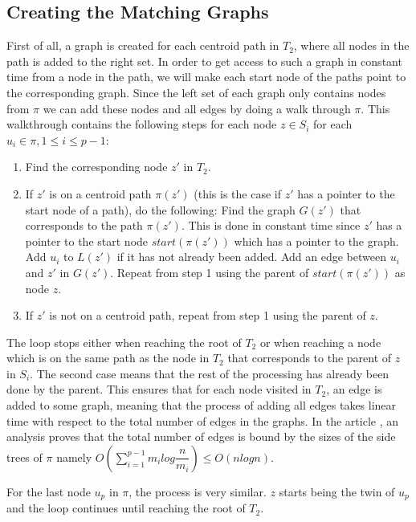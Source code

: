 \subsection{Creating the Matching Graphs}
First of all, a graph is created for each centroid path in $T_2$, where all nodes in the path is added to the right set. In order to get access to such a graph in constant time from a node in the path, we will make each start node of the paths point to the corresponding graph.
Since the left set of each graph only contains nodes from $\pi$ we can add these nodes and all edges by doing a walk through $\pi$. This walkthrough contains the following steps for each node $z \in S_i$ for each $u_i \in \pi, 1 \le i \le p-1$:

\begin{enumerate}
	\item Find the corresponding node $z'$ in $T_2$.
	\item If $z'$ is on a centroid path $\pi(z')$ (this is the case if $z'$ has a pointer to the start node of a path), do the following:
	\subitem Find the graph $G(z')$ that corresponds to the path $\pi(z')$. This is done in constant time since $z'$ has a pointer to the start node $start(\pi(z'))$ which has a pointer to the graph.
	\subitem Add $u_i$ to $L(z')$ if it has not already been added.
	\subitem Add an edge between $u_i$ and $z'$ in $G(z')$.
	\subitem Repeat from step 1 using the parent of $start(\pi(z'))$ as node $z$.
	\item If $z'$ is not on a centroid path, repeat from step 1 using the parent of $z$.
\end{enumerate}
The loop stops either when reaching the root of $T_2$ or when reaching a node which is on the same path as the node in $T_2$ that corresponds to the parent of $z$ in $S_i$. The second case means that the rest of the processing has already been done by the parent. This ensures that for each node visited in $T_2$, an edge is added to some graph, meaning that the process of adding all edges takes linear time with respect to the total number of edges in the graphs. In the article \cite{nlogn}, an analysis proves that the total number of edges is bound by the sizes of the side trees of $\pi$ namely $O(\sum_{i=1}^{p-1}m_ilog\dfrac{n}{m_i}) \le O(nlogn)$.

For the last node $u_p$ in $\pi$, the process is very similar. $z$ starts being the twin of $u_p$ and the loop continues until reaching the root of $T_2$.\\

